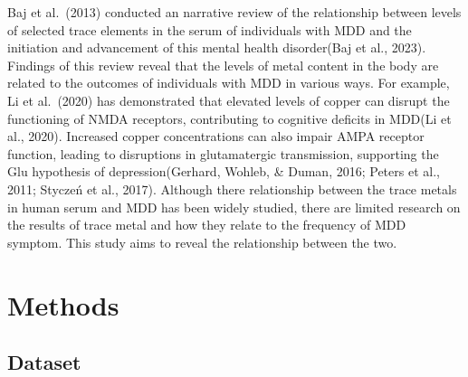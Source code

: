 \documentclass[
  man]{apa6}
\begin{document}
Baj et al.~(2013) conducted an narrative review of the relationship between levels of selected trace elements in the serum of individuals with MDD and the initiation and advancement of this mental health disorder(Baj et al., 2023). Findings of this review reveal that the levels of metal content in the body are related to the outcomes of individuals with MDD in various ways. For example, Li et al.~(2020) has demonstrated that elevated levels of copper can disrupt the functioning of NMDA receptors, contributing to cognitive deficits in MDD(Li et al., 2020). Increased copper concentrations can also impair AMPA receptor function, leading to disruptions in glutamatergic transmission, supporting the Glu hypothesis of depression(Gerhard, Wohleb, \& Duman, 2016; Peters et al., 2011; Styczeń et al., 2017).
Although there relationship between the trace metals in human serum and MDD has been widely studied, there are limited research on the results of trace metal and how they relate to the frequency of MDD symptom. This study aims to reveal the relationship between the two.

\begin{table}
\centering
\caption{\label{tab:racial-demographic}Racial Demographics}
\centering
{}
\end{table}

\hypertarget{methods}{%
\section{Methods}\label{methods}}

\hypertarget{dataset}{%
\subsection{Dataset}\label{dataset}}
\end{document}
